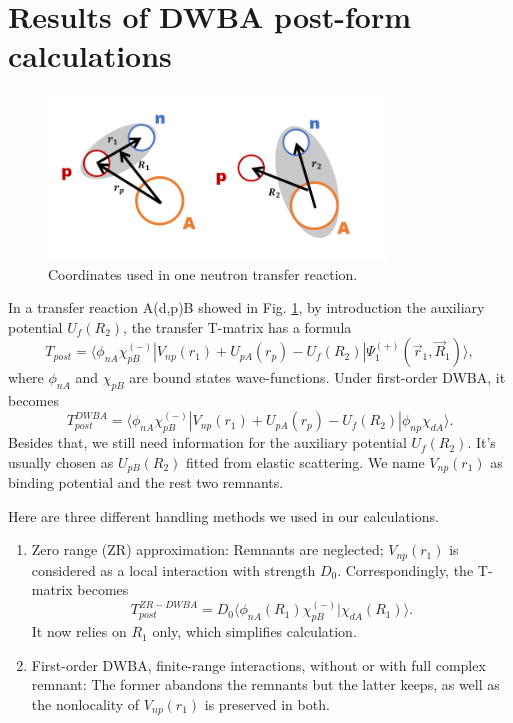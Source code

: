 \section{Results of DWBA post-form calculations}\label{sec:post}

\begin{figure}[t]
	\centering
	\includegraphics[width=0.80\textwidth]{transfer.png}
	\caption{Coordinates used in one neutron transfer reaction. }
	\label{fig:transfer}
\end{figure}
In a transfer reaction A(d,p)B showed in Fig. \ref{fig:transfer}, by introduction the auxiliary potential $U_f(R_2)$, the transfer T-matrix has a formula \cite{thompson2009nuclear}
\begin{equation}\label{eq:postexact}
	T_{post}=\langle\phi_{nA}\chi_{pB}^{(-)}\left|V_{np}(r_1)+U_{pA}(r_p)-U_f(R_2)\right|\Psi_1^{(+)}(\vec{r}_1,\vec{R}_1)\rangle,
\end{equation}
where $\phi_{nA}$ and $\chi_{pB}$ are bound states wave-functions. 
Under first-order DWBA, it becomes
\begin{equation}\label{tpost}
	T_{post}^{DWBA}=\langle\phi_{nA}\chi_{pB}^{(-)}\left|V_{np}(r_1)+U_{pA}(r_p)-U_f(R_2)\right|\phi_{np}\chi_{dA}\rangle.
\end{equation}
Besides that, we still need information for the auxiliary potential $U_f(R_2)$. 
It's usually chosen as $U_{pB}(R_2)$ fitted from elastic scattering.
We name $V_{np}(r_1)$ as binding potential and the rest two remnants.

Here are three different handling methods we used in our calculations.
\begin{enumerate}
\item Zero range (ZR) approximation: Remnants are neglected; $V_{np}(r_1)$ is considered as a local interaction with strength $D_0$.
	Correspondingly, the T-matrix becomes
	\begin{equation}
		T_{post}^{ZR-DWBA}=D_0\langle\phi_{nA}(R_1)\chi_{pB}^{(-)}| \chi_{dA}(R_1)\rangle.
	\end{equation}
	It now relies on $R_1$ only, which simplifies calculation.
	\item First-order DWBA, finite-range interactions, without or with full complex remnant: The former abandons the remnants but the latter keeps, as well as the nonlocality of $V_{np}(r_1)$ is preserved in both.
\end{enumerate}

